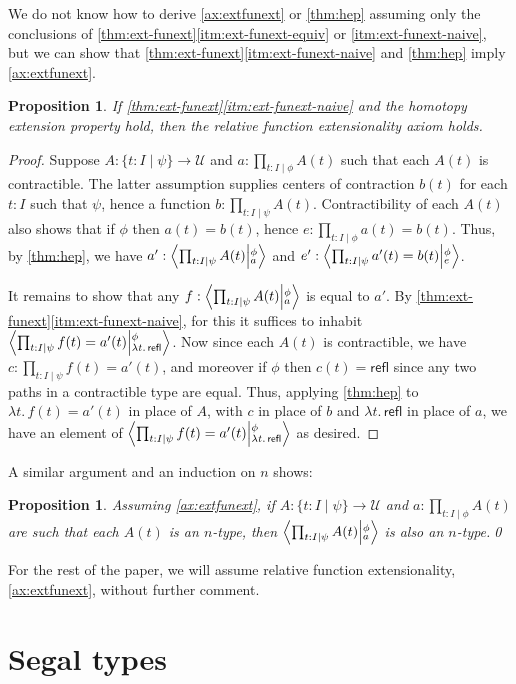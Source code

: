 \documentclass[12pt]{amsart}
\theoremstyle{plain}
\newtheorem{prop}[thm]{Proposition}
\theoremstyle{definition}
\theoremstyle{remark}
\numberwithin{equation}{section}
\newcommand{\tprod}{\textstyle\prod}
\newcommand{\exten}[4]{\left\langle\mathchoice{\textstyle\prod_{#1}}{\textstyle\prod_{#1}}{\scriptstyle\prod_{#1}}{\scriptscriptstyle\prod_{#1}} #2 \middle|^{#3}_{#4}\right\rangle}
\newcommand{\univtype}{\mathcal{U}}
\newcommand{\sh}[2]{\{#1\mid #2\}}
\newcommand{\refl}{\mathsf{refl}}
\newcommand{\lam}[1]{\lambda #1.\,}
\begin{document}
We do not know how to derive \cref{ax:extfunext} or \cref{thm:hep} assuming only the conclusions of \cref{thm:ext-funext}\ref{itm:ext-funext-equiv} or \ref{itm:ext-funext-naive}, but we can show that  \cref{thm:ext-funext}\ref{itm:ext-funext-naive} and  \cref{thm:hep} imply  \cref{ax:extfunext}.

\begin{prop}
If \cref{thm:ext-funext}\ref{itm:ext-funext-naive} and the homotopy extension property hold, then the relative function extensionality axiom holds.
\end{prop}
\begin{proof}
  Suppose $A:\sh{t:I}{\psi}\to\univtype$ and $a:\tprod_{t:I\mid\phi} A(t)$ such that each $A(t)$ is contractible.
  The latter assumption supplies centers of contraction $b(t)$ for each $t:I$ such that $\psi$, hence a function $b:\tprod_{t:I\mid\psi} A(t)$.
  Contractibility of each $A(t)$ also shows that if $\phi$ then $a(t)=b(t)$, hence $e:\tprod_{t:I\mid\phi} a(t) = b(t)$.
  Thus, by \cref{thm:hep}, we have $a':\exten{t:I\mid\psi}{A(t)}{\phi}{a}$ and $e':\exten{t:I\mid\psi}{a'(t)=b(t)}{\phi}{e}$.

  It remains to show that any $f:\exten{t:I\mid\psi}{A(t)}{\phi}{a}$ is equal to $a'$.
  By \cref{thm:ext-funext}\ref{itm:ext-funext-naive}, for this it suffices to inhabit $\exten{t:I\mid\psi}{f(t)=a'(t)}{\phi}{\lam{t}\refl}$.
  Now since each $A(t)$ is contractible, we have $c:\tprod_{t:I\mid\psi} f(t)=a'(t)$, and moreover if $\phi$ then $c(t) = \refl$ since any two paths in a contractible type are equal.
  Thus, applying \cref{thm:hep} to $\lam{t} f(t)=a'(t)$ in place of $A$, with $c$ in place of $b$ and $\lam{t}\refl$ in place of $a$, we have an element of $\exten{t:I\mid\psi}{f(t)=a'(t)}{\phi}{\lam{t}\refl}$ as desired.
\end{proof}

A similar argument and an induction on $n$ shows:

\begin{prop}
  Assuming \cref{ax:extfunext}, if $A:\sh{t:I}{\psi}\to\univtype$ and $a:\tprod_{t:I\mid\phi} A(t)$ are such that each $A(t)$ is an $n$-type, then $\exten{t:I\mid\psi}{A(t)}{\phi}{a}$ is also an $n$-type.\qed
\end{prop}

For the rest of the paper, we will assume relative function extensionality, \cref{ax:extfunext}, without further comment.


\section{Segal types}
\label{sec:Segal-types}
\end{document}
